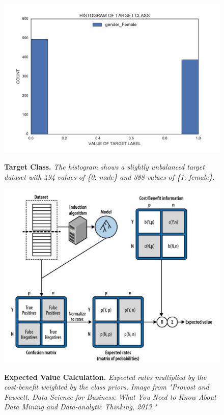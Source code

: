 \begin{figure}[!hbtp]
\centering

    \caption{\textbf{Target Class. }\textit{The histogram shows a slightly unbalanced target dataset with 494 values of \{0: male\} and 388 values of \{1: female\}.}}

    \includegraphics[width=1\textwidth]{figures/targetClass}
    \label{targetClass}
\end{figure}

\begin{figure}[!hbtp]
\centering

    \caption{\textbf{Expected Value Calculation. }\textit{Expected rates multiplied by the cost-benefit weighted by the class priors. Image from "Provost and Fawcett. Data Science for Business: What You Need to Know About Data Mining and Data-analytic Thinking, 2013."}}

    \includegraphics[width=1\textwidth]{figures/expectedValueCalculation.png}
    \label{expectedValue}
\end{figure}



